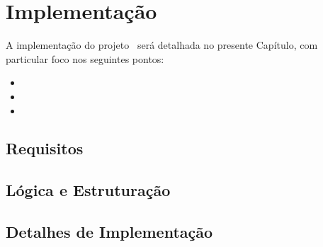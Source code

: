 \chapter{Implementação}
\label{ch::impl}


A implementação do projeto \theapp~será detalhada no presente Capítulo, com particular foco nos seguintes pontos:

\begin{itemize}[nosep]
	\item 
	\item 
	\item 
\end{itemize}


\section{Requisitos}
\label{sec::impl:requisitos}



\section{Lógica e Estruturação}
\label{sec::impl:estrutura}



\section{Detalhes de Implementação}
\label{sec::impl:detalhes}






